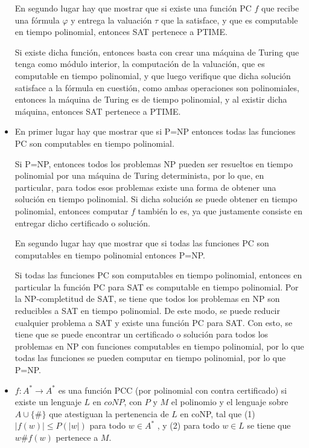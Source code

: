 \documentclass[letterpaper,10pt]{article}
\begin{document}
\begin{itemize}
    En segundo lugar hay que mostrar que si existe una función PC $f$ que recibe una fórmula $\varphi$ y entrega la valuación $\tau$ que la satisface, y que es computable en tiempo polinomial, entonces SAT pertenece a PTIME.

    Si existe dicha función, entonces basta con crear una máquina de Turing que tenga como módulo interior, la computación de la valuación, que es computable en tiempo polinomial, y que luego verifique que dicha solución satisface a la fórmula en cuestión, como ambas operaciones son polinomiales, entonces la máquina de Turing es de tiempo polinomial, y al existir dicha máquina, entonces SAT pertenece a PTIME.

    \item En primer lugar hay que mostrar que si P=NP entonces todas las funciones PC son computables en tiempo polinomial.

    Si P=NP, entonces todos los problemas NP pueden ser resueltos en tiempo polinomial por una máquina de Turing determinista, por lo que, en particular, para todos esos problemas existe una forma de obtener una solución en tiempo polinomial. Si dicha solución se puede obtener en tiempo polinomial, entonces computar $f$ también lo es, ya que justamente consiste en entregar dicho certificado o solución.

    En segundo lugar hay que mostrar que si todas las funciones PC son computables en tiempo polinomial entonces P=NP.

    Si todas las funciones PC son computables en tiempo polinomial, entonces en particular la función PC para SAT es computable en tiempo polinomial. Por la NP-completitud de SAT, se tiene que todos los problemas en NP son reducibles a SAT en tiempo polinomial. De este modo, se puede reducir cualquier problema a SAT y existe una función PC para SAT. Con esto, se tiene que se puede encontrar un certificado o solución para todos los problemas en NP con funciones computables en tiempo polinomial, por lo que todas las funciones se pueden computar en tiempo polinomial, por lo que P=NP.

    \item $f : A^* \rightarrow A^*$ es una función PCC (por polinomial con contra certificado) si existe un lenguaje $L$ en $coNP$, con $P$ y $M$ el polinomio y el lenguaje sobre $A \cup \{\#\}$ que atestiguan la pertenencia de $L$ en coNP, tal que (1) $|f(w)| \leq P(|w|)$ para todo $w \in A^*$ , y (2) para todo $w \in L$ se tiene que $w\#f(w)$ pertenece a $M$.


\end{itemize}
\end{document}
